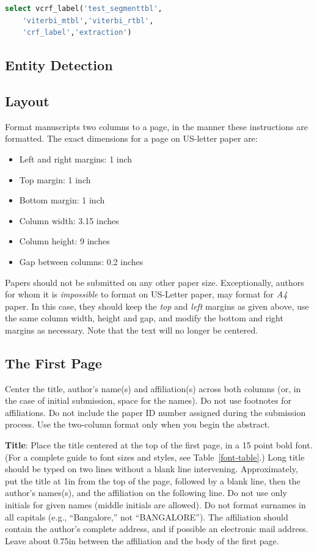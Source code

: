 \documentclass[11pt,letterpaper]{article}
\begin{document}
\begin{lstlisting}[language=SQL,gobble=4]
    select vcrf_label('test_segmenttbl', 
    'viterbi_mtbl','viterbi_rtbl',
    'crf_label','extraction')
\end{lstlisting}


\subsection{Entity Detection}

\subsection{Layout}
\label{ssec:layout}

Format manuscripts two columns to a page, in the manner these
instructions are formatted. The exact dimensions for a page on US-letter
paper are:

\begin{itemize}
\item Left and right margins: 1 inch
\item Top margin: 1 inch
\item Bottom margin: 1 inch
\item Column width: 3.15 inches
\item Column height: 9 inches
\item Gap between columns: 0.2 inches
\end{itemize}

\noindent Papers should not be submitted on any other paper size. Exceptionally,
authors for whom it is \emph{impossible} to format on US-Letter paper,
may format for \emph{A4} paper. In this case, they should keep the \emph{top}
and \emph{left} margins as given above, use the same column width,
height and gap, and modify the bottom and right margins as necessary.
Note that the text will no longer be centered.

\subsection{The First Page}
\label{ssec:first}

Center the title, author's name(s) and affiliation(s) across both
columns (or, in the case of initial submission, space for the names). 
Do not use footnotes for affiliations.  Do not include the
paper ID number assigned during the submission process. 
Use the two-column format only when you begin the abstract.

{\bf Title}: Place the title centered at the top of the first page, in
a 15 point bold font.  (For a complete guide to font sizes and styles, see Table~\ref{font-table}.)
Long title should be typed on two lines without
a blank line intervening. Approximately, put the title at 1in from the
top of the page, followed by a blank line, then the author's names(s),
and the affiliation on the following line.  Do not use only initials
for given names (middle initials are allowed). Do not format surnames
in all capitals (e.g., ``Bangalore,'' not ``BANGALORE'').  The affiliation should
contain the author's complete address, and if possible an electronic
mail address. Leave about 0.75in between the affiliation and the body
of the first page.
\end{document}
